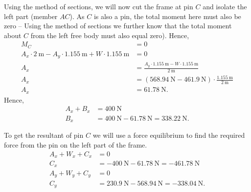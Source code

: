\begin{derivation}
  Using the method of sections, we will now cut the frame at pin $C$ and isolate the left part (member $AC$). 
  As $C$ is also a pin, the total moment here must also be zero -- Using the method of sections we further know that the total moment about $C$ from the left free body must also equal zero).
  Hence,
  \begin{align*}
    M_C &= 0 \\
    A_x \cdot \qty{2}{\m} - A_y \cdot \qty{1.155}{\m} + W \cdot \qty{1.155}{\m} &= 0 \\
    A_x &= \frac{A_y \cdot \qty{1.155}{\m} - W \cdot \qty{1.155}{\m}}{\qty{2}{\m} } \\
    A_x &= \left( \qty{568.94}{\N} - \qty{461.9}{\N} \right) \cdot \frac{\qty{1.155}{\m} }{\qty{2}{\m} } \\
    A_x &= \qty{61,78}{\N}
  .\end{align*}
  Hence,
  \begin{align*}
    A_x + B_x &= \qty{400}{\N}  \\
    B_x &= \qty{400}{\N} - \qty{61.78}{\N}  = \qty{338,22}{\N}
  .\end{align*}
  
  To get the resultant of pin $C$ we will use a force equilibrium to find the required force from the pin on the left part of the frame.
  \begin{align*}
    A_x + W_x + C_x &= 0 \\
    C_x &= -\qty{400}{\N} - \qty{61.78}{\N} = - \qty{461,78}{\N} \\
    A_y + W_y + C_y &= 0 \\
    C_y &= \qty{230.9}{\N} - \qty{568.94}{\N}   = \qty{-338,04}{\N}
  .\end{align*}
\end{derivation}

